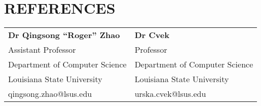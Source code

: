 \documentclass[a4paper,9pt]{article}
\begin{document}
\section*{REFERENCES}

\noindent
\begin{tabular}{|p{}|p{}|}
\hline
\textbf{Dr Qingsong “Roger” Zhao} & \textbf{Dr Cvek} \\
Assistant Professor & Professor \\
Department of Computer Science & Department of Computer Science \\
Louisiana State University & Louisiana State University \\
qingsong.zhao@lsus.edu & urska.cvek@lsus.edu \\
\hline
\end{tabular}
\end{document}
